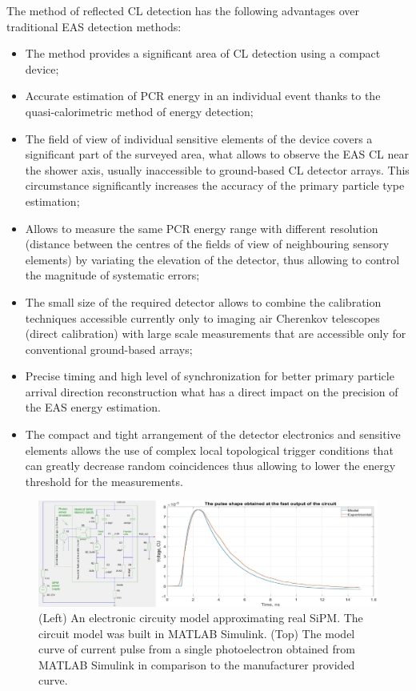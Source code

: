 \documentclass[a4paper]{jpconf}
\begin{document}
The method of reflected CL detection has the following advantages over traditional EAS detection methods:
\begin{itemize}
\item The method provides a significant area of CL detection using a compact device;
\item Accurate estimation of PCR energy in an individual event thanks to the quasi-calorimetric method of energy detection;
\item The field of view of individual sensitive elements of the device covers a significant part of the surveyed area, what allows to observe the EAS CL near the shower axis, usually inaccessible to ground-based CL detector arrays. This circumstance significantly increases the accuracy of the primary particle type estimation;
\item Allows to measure the same PCR energy range with different resolution (distance between the centres of the fields of view of neighbouring sensory elements) by variating the elevation of the detector, thus allowing to control the magnitude of systematic errors;
\item The small size of the required detector allows to combine the calibration techniques accessible currently only to imaging air Cherenkov telescopes (direct calibration) with large scale measurements that are accessible only for conventional ground-based arrays;
\item Precise timing and high level of synchronization for better primary particle arrival direction reconstruction what has a direct impact on the precision of the EAS energy estimation.
\item The compact and tight arrangement of the detector electronics and sensitive elements allows the use of complex local topological trigger conditions that can greatly decrease random coincidences thus allowing to lower the energy threshold for the measurements.
\end{itemize}

\begin{figure}[t]
\centering %
\includegraphics[width=\textwidth]{Fig2.png}
\caption{(Left) An electronic circuity model approximating real SiPM. The circuit model was built in MATLAB Simulink. (Top) The model curve of current pulse from a single photoelectron obtained from MATLAB Simulink in comparison to the manufacturer provided curve.}
\label{fig:Sphere_results}
\end{figure}
\end{document}
